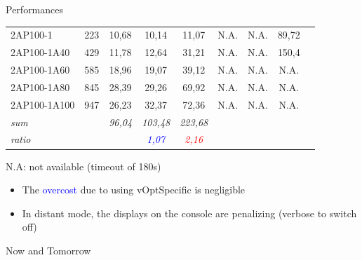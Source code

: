 \documentclass[10pt,xcolor=dvipsnames]{beamer}
\newcommand{\red}{\textcolor{red}}
\newcommand{\blue}{\textcolor{blue}}
\begin{document}
\begin{frame}{Performances}
{\begin{center}
\begin{tabular}{| l | c || c | c | c | c | c | c | c |}
    \hline 												
2AP100-1	        &223 	&	10,68	&	10,14	&	11,07	&	N.A.	&	N.A.	&	89,72	\\
2AP100-1A40	& 429 &	11,78	&	12,64	&	31,21	&	N.A.	&	N.A.	&	150,4	\\
2AP100-1A60	& 585 &	18,96	&	19,07	&	39,12	&	N.A.	&	N.A.	&	N.A.	\\
2AP100-1A80	& 845 &	28,39	&	29,26	&	69,92	&	N.A.	&	N.A.	&	N.A.	\\
2AP100-1A100	& 947 &	26,23	&	32,37	&	72,36	&	N.A.	&	N.A.	&	N.A.	\\                                          
  \hspace{5mm} \textit{sum}    &        &    \textit{96,04}  &	\textit{103,48}  &	\textit{223,68}  &   &  &   \\
  \hspace{5mm} \textit{ratio}     &        &             &     \textit{\blue{1,07}}	&      \textit{\red{2,16}}	 & 	           &   	&  \\	 

    \hline
\end{tabular}
\end{center}

N.A: not available (timeout of 180s)
}

{\small 
%
\begin{itemize}
\item The \blue{overcost} due to using vOptSpecific is negligible%

\item In distant mode, the displays on the console are penalizing (verbose to switch off) %
\end{itemize}
}

%
%

\end{frame}




{%
\begin{frame}[standout]
Now and Tomorrow
\end{frame}
}
\end{document}

